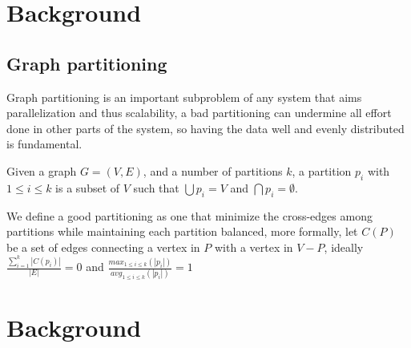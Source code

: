 \section{Background}
\subsection{Graph partitioning}
Graph partitioning is an important subproblem of any system that aims parallelization and thus scalability, a bad partitioning can undermine all effort done in other parts of the system, so having the data well and evenly distributed is fundamental.


Given a graph $G = (V, E)$, and a number of partitions $k$, a partition $p_i$ with $1 \leq i \leq k$ is a subset of $V$ such that $\bigcup p_i = V$ and $\bigcap p_i = \emptyset$.

We define a good partitioning as one that minimize the cross-edges among partitions while maintaining each partition balanced, more formally, let $C(P)$ be a set of edges connecting a vertex in $P$ with a vertex in $V - P$, ideally $\frac{\sum_{i=1}^{k}|C(p_i)|}{|E|} = 0$ and $\frac{max_{1 \leq i \leq k}(|p_i|)}{avg_{1 \leq i \leq k}(|p_i|)} = 1$\section{Background}
